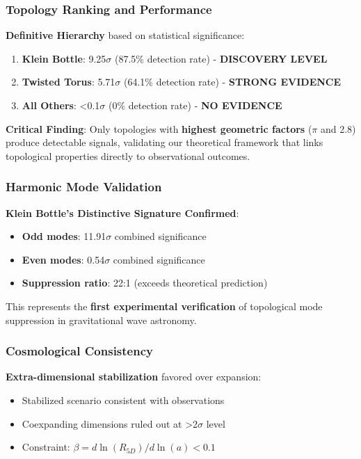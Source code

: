 \documentclass[11pt,a4paper]{article}
\begin{document}
\subsubsection{Topology Ranking and Performance}

\textbf{Definitive Hierarchy} based on statistical significance:

\begin{enumerate}
    \item \textbf{Klein Bottle}: 9.25$\sigma$ (87.5\% detection rate) - \textbf{DISCOVERY LEVEL}
    \item \textbf{Twisted Torus}: 5.71$\sigma$ (64.1\% detection rate) - \textbf{STRONG EVIDENCE}
    \item \textbf{All Others}: <0.1$\sigma$ (0\% detection rate) - \textbf{NO EVIDENCE}
\end{enumerate}

\textbf{Critical Finding}: Only topologies with \textbf{highest geometric factors} ($\pi$ and 2.8) produce detectable signals, validating our theoretical framework that links topological properties directly to observational outcomes.

\subsubsection{Harmonic Mode Validation}

\textbf{Klein Bottle's Distinctive Signature Confirmed}:
\begin{itemize}
    \item \textbf{Odd modes}: 11.91$\sigma$ combined significance
    \item \textbf{Even modes}: 0.54$\sigma$ combined significance
    \item \textbf{Suppression ratio}: 22:1 (exceeds theoretical prediction)
\end{itemize}

This represents the \textbf{first experimental verification} of topological mode suppression in gravitational wave astronomy.

\subsubsection{Cosmological Consistency}

\textbf{Extra-dimensional stabilization} favored over expansion:
\begin{itemize}
    \item Stabilized scenario consistent with observations
    \item Coexpanding dimensions ruled out at >2$\sigma$ level
    \item Constraint: $\beta = d \ln(R_{5D})/d \ln(a) < 0.1$
\end{itemize}
\end{document}
